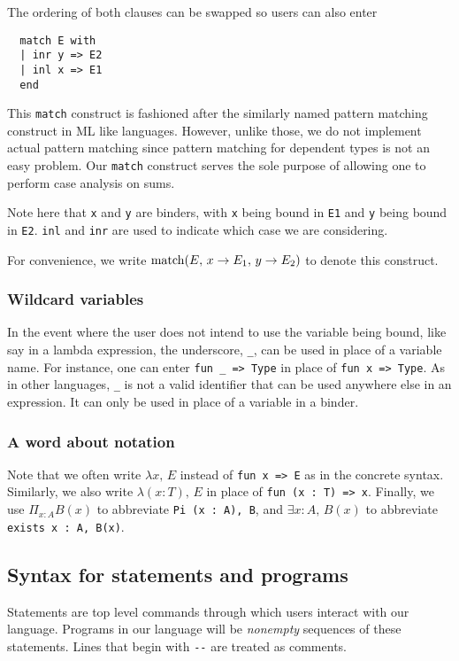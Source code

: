 \documentclass{article}
\begin{document}
\begin{enumerate}
The ordering of both clauses can be swapped so users can also enter
\begin{verbatim}
  match E with
  | inr y => E2
  | inl x => E1
  end
\end{verbatim}

This \verb|match| construct is fashioned after the similarly named pattern
matching construct in ML like languages.
However, unlike those, we do not implement actual pattern matching since pattern
matching for dependent types is not an easy problem.
Our \verb|match| construct serves the sole purpose of allowing one to perform
case analysis on sums.

Note here that \verb|x| and \verb|y| are binders, with \verb|x| being bound in
\verb|E1| and \verb|y| being bound in \verb|E2|.
\verb|inl| and \verb|inr| are used to indicate which case we are
considering.

For convenience, we write 
$\operatorname{match}(E, \, x \rightarrow E_1, \, y \rightarrow E_2)$ to denote this
construct.

\end{enumerate}

\subsubsection{Wildcard variables}
In the event where the user does not intend to use the variable being bound,
like say in a lambda expression, the underscore, \verb|_|, can be used in place
of a variable name.
For instance, one can enter \verb|fun _ => Type| in place of \verb|fun x => Type|.
As in other languages, \verb|_| is not a valid identifier that can be used
anywhere else in an expression. It can only be used in place of a variable in a
binder.

\subsubsection{A word about notation}
Note that we often write $\lambda x, \, E$ instead of \verb|fun x => E| as in the
concrete syntax. Similarly, we also write $\lambda (x : T), \, E$ in place of
\verb|fun (x : T) => x|.
Finally, we use $\Pi_{x : A}B(x)$ to abbreviate 
\verb|Pi (x : A), B|, and
$\exists x : A, \, B(x)$ to abbreviate \verb|exists x : A, B(x)|.

\subsection{Syntax for statements and programs}
Statements are top level commands through which users interact with our
language. Programs in our language will be \textit{nonempty} sequences of
these statements. Lines that begin with \verb|--| are treated as comments.
\end{document}
